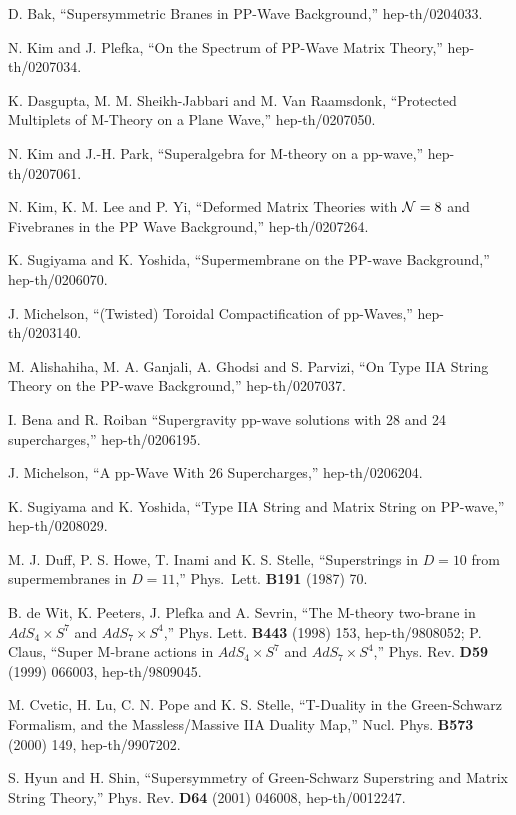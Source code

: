 \documentclass[a4paper,12pt]{article}
\begin{document}
\begin{thebibliography}{99}
 D. Bak, ``Supersymmetric Branes in PP-Wave
  Background,'' hep-th/0204033.

 N. Kim and J. Plefka, ``On the Spectrum of PP-Wave
  Matrix Theory,'' hep-th/0207034.

 K. Dasgupta, M. M. Sheikh-Jabbari and M. Van
  Raamsdonk, ``Protected Multiplets of M-Theory on a Plane Wave,''
  hep-th/0207050.

 N. Kim and J.-H. Park, ``Superalgebra for M-theory on
  a pp-wave,'' hep-th/0207061.

 N. Kim, K. M. Lee and P. Yi, ``Deformed Matrix
  Theories with ${\cal N}=8$ and Fivebranes in the PP Wave
  Background,'' hep-th/0207264.

 K. Sugiyama and K. Yoshida, ``Supermembrane on the
  PP-wave Background,'' hep-th/0206070.
  
 J. Michelson, ``(Twisted) Toroidal Compactification
  of pp-Waves,'' hep-th/0203140.
  
 M. Alishahiha, M. A. Ganjali, A. Ghodsi and S.
  Parvizi, ``On Type IIA String Theory on the PP-wave Background,''
  hep-th/0207037.

 I. Bena and R. Roiban ``Supergravity pp-wave
  solutions with 28 and 24 supercharges,'' hep-th/0206195.

 J. Michelson, ``A pp-Wave With 26 Supercharges,''
  hep-th/0206204.

 K. Sugiyama and K. Yoshida, ``Type IIA String and
  Matrix String on PP-wave,'' hep-th/0208029.

 M. J. Duff, P. S. Howe, T. Inami and K. S. Stelle,
  ``Superstrings in $D=10$ from supermembranes in $D=11$,''
  Phys.~Lett.  {\bf B191} (1987) 70.
  
 B. de Wit, K. Peeters, J. Plefka and A. Sevrin, ``The
  M-theory two-brane in $AdS_4 \times S^7$ and $AdS_7 \times S^4$,''
  Phys. Lett. {\bf B443} (1998) 153, hep-th/9808052; P. Claus, ``Super
  M-brane actions in $AdS_4 \times S^7$ and $AdS_7 \times S^4$,''
  Phys. Rev. {\bf D59} (1999) 066003, hep-th/9809045.

 M. Cvetic, H. Lu, C. N. Pope and K. S. Stelle,
  ``T-Duality in the Green-Schwarz Formalism, and the Massless/Massive
  IIA Duality Map,'' Nucl. Phys. {\bf B573} (2000) 149,
  hep-th/9907202.
  
 S. Hyun and H. Shin, ``Supersymmetry of Green-Schwarz
  Superstring and Matrix String Theory,'' Phys. Rev. {\bf D64} (2001)
  046008, hep-th/0012247.
  

\end{thebibliography}
\end{document}
